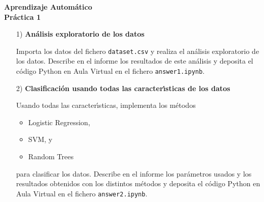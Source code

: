 \documentclass{article}
\begin{document}
\begin{center}
\bf{\large 
{\Large Aprendizaje Autom\'atico}\\
{\vspace{0.1cm}}
Pr\'actica 1
}
\end{center}

\bigskip

\begin{itemize}

\item[1)]  {\bf An\'alisis exploratorio de los datos}

Importa los datos del fichero \texttt{dataset.csv} y realiza el an\'alisis exploratorio de los datos. Describe en el informe los resultados de este análisis y deposita el c\'odigo Python en Aula Virtual en el fichero \texttt{answer1.ipynb}.

\end{itemize}

\bigskip

\begin{itemize}

\item[2)] {\bf Clasificaci\'on usando todas las caracter\'{\i}sticas de los datos}

Usando todas las caracter\'{\i}sticas, implementa los m\'etodos 

\begin{itemize}

\item
Logistic Regression, 

\item
SVM, y

\item
Random Trees

\end{itemize}

para clasificar los datos. Describe en el informe los par\'ametros usados y los resultados obtenidos con los distintos m\'etodos y deposita el c\'odigo Python en Aula Virtual en el fichero \texttt{answer2.ipynb}.

\end{itemize}

\bigskip
\end{document}
